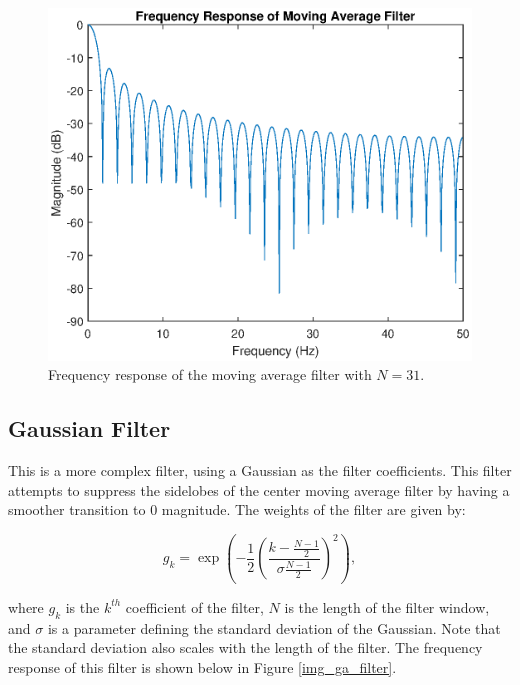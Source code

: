                 \begin{figure}[!th]
                    \includegraphics[width=\textwidth]{Images/cm_filter.eps}
                    \centering
                    \caption{Frequency response of the moving average filter with $N=31$.}
                    \label{img_cm_filter}
                \end{figure}

            \subsection{Gaussian Filter}

                This is a more complex filter, using a Gaussian as the filter coefficients. This filter attempts to suppress the sidelobes of the center moving average filter by having a smoother transition to 0 magnitude. The weights of the filter are given by:

                \begin{equation}
                    g_k = \exp(-\frac{1}{2}(\frac{k - \frac{N-1}{2}}{\sigma \frac{N-1}{2}})^2),
                \end{equation}

                where $g_k$ is the $k^{th}$ coefficient of the filter, $N$ is the length of the filter window, and $\sigma$ is a parameter defining the standard deviation of the Gaussian. Note that the standard deviation also scales with the length of the filter. The frequency response of this filter is shown below in Figure \ref{img_ga_filter}.


